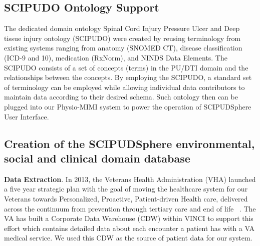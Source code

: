 \documentclass{amia}
\begin{document}
\subsection{SCIPUDO Ontology Support}
The dedicated domain ontology Spinal Cord Injury Pressure Ulcer and Deep tissue injury ontology (SCIPUDO) were created by reusing terminology from existing systems ranging from anatomy (SNOMED CT), disease classification (ICD-9 and 10), medication (RxNorm), and NINDS Data Elements. The SCIPUDO consists of a set of concepts (terms) in the PU/DTI domain and the relationships between the concepts. By employing the SCIPUDO, a standard set of terminology can be employed while allowing individual data contributors to maintain data according to their desired schema. Such ontology then can be plugged into our Physio-MIMI system to power the operation of SCIPUDSphere User Interface.

\subsection{Creation of the SCIPUDSphere environmental, social and clinical domain database}

{\bf Data Extraction}. In 2013, the Veterans Health Administration (VHA) launched a five year strategic plan with the goal of moving the healthcare system for our Veterans towards Personalized, Proactive, Patient-driven Health care, delivered across the continuum from prevention through tertiary care and end of life ~\cite{vha_plan}. The VA has built a Corporate Data Warehouse (CDW) within VINCI to support this effort which contains detailed data about each encounter a patient has with a VA medical service.  We used this CDW as the source of patient data for our system. 

\end{document}
